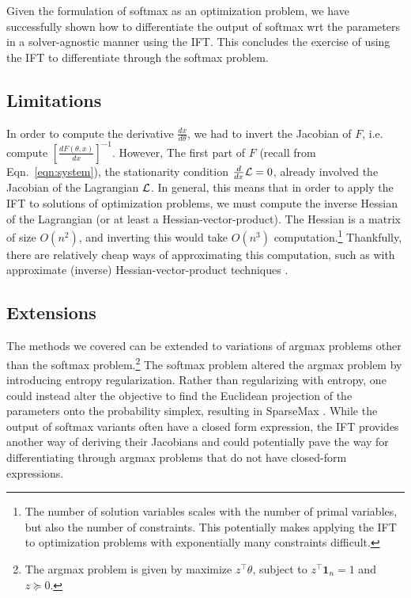 \documentclass[11pt]{article}
\begin{document}
Given the formulation of softmax as an optimization problem, we have
successfully shown how to differentiate
the output of softmax wrt the parameters in a solver-agnostic manner using the IFT.
This concludes the exercise of using the IFT to differentiate through the
softmax problem.


\subsection{Limitations}
\label{sec:limitations}
In order to compute the derivative $\frac{dx}{d\theta}$, we had to invert the Jacobian of $F$,
i.e. compute $\left[\frac{dF(\theta,x)}{dx}\right]^{-1}$.
However, The first part of $F$ (recall from Eqn.~\ref{eqn:system}), the stationarity condition
$\frac{d}{dx}\mathcal{L} = 0$,
already involved the Jacobian of the Lagrangian $\mathcal{L}$.
In general, this means that in order to apply the IFT to solutions of optimization problems,
we must compute the inverse Hessian of the Lagrangian (or at least a Hessian-vector-product).
The Hessian is a matrix of size $O(n^2)$,
and inverting this would take $O(n^3)$ computation.\footnote{
The number of solution variables scales with the number of primal variables,
but also the number of constraints.
This potentially makes applying the IFT to optimization problems with exponentially
many constraints difficult.
}
Thankfully, there are relatively cheap ways of approximating this computation,
such as with approximate (inverse) Hessian-vector-product techniques
\citep{rajeswaran2019imaml,lorraine2019hoift}.

\subsection{Extensions}
The methods we covered can be extended to variations of argmax problems
other than the softmax problem.\footnote{
The argmax problem is given by maximize $z^\top \theta$, subject to $z^\top\mathbf{1}_n=1$
and $z\succeq 0$.
}
The softmax problem altered the argmax problem by introducing entropy regularization.
Rather than regularizing with entropy, one could instead alter the objective to find
the Euclidean projection of the parameters onto the probability simplex,
resulting in SparseMax \citep{sparsemax}.
While the output of softmax variants often have a closed form expression,
the IFT provides another way of deriving their Jacobians
and could potentially pave the way for differentiating through argmax problems
that do not have closed-form expressions.
\end{document}
